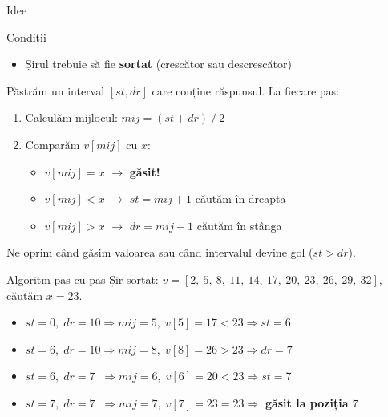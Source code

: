 \documentclass{beamer}
\begin{document}
\begin{frame}{Idee}
  \begin{block}{Condiții}
    \begin{itemize}
      \item Șirul trebuie să fie \textbf{sortat} (crescător sau descrescător)
    \end{itemize}
  \end{block}

  \smallskip
  Păstrăm un interval $[st, dr]$ care conține răspunsul. La fiecare pas:
  \begin{enumerate}
    \item Calculăm mijlocul: $mij = (st + dr) \ / \ 2$
    \item Comparăm $v[mij]$ cu $x$:
    \begin{itemize}
      \item $v[mij] = x$ $\rightarrow$ \textbf{găsit!}
      \item $v[mij] < x$ $\rightarrow$ $st = mij + 1$ \textemdash{} căutăm în dreapta
      \item $v[mij] > x$ $\rightarrow$ $dr = mij - 1$ \textemdash{} căutăm în stânga
    \end{itemize}
  \end{enumerate}
  \smallskip
  Ne oprim când găsim valoarea sau când intervalul devine gol ($st > dr$).
\end{frame}

\begin{frame}{Algoritm pas cu pas}
  Șir sortat: $v = [2,\ 5,\ 8,\ 11,\ 14,\ 17,\ 20,\ 23,\ 26,\ 29,\ 32]$, căutăm $x = 23$.

  \smallskip
  \begin{itemize}
    \item $st=0,\;dr=10 \Rightarrow mij=5,\;v[5]=17 < 23 \Rightarrow st = 6$
    \item $st=6,\;dr=10 \Rightarrow mij=8,\;v[8]=26 > 23 \Rightarrow dr = 7$
    \item $st=6,\;dr=7\;\;\Rightarrow mij=6,\;v[6]=20 < 23 \Rightarrow st = 7$
    \item $st=7,\;dr=7\;\;\Rightarrow mij=7,\;v[7]=23 = 23 \Rightarrow$ \textbf{găsit la poziția $7$} \checkmark
  \end{itemize}
\end{frame}
\end{document}
